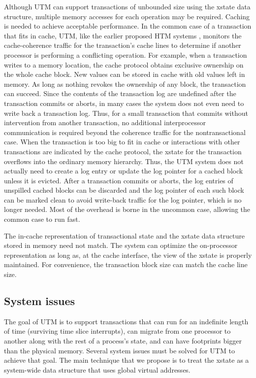 Although UTM can support transactions of unbounded size using the
xstate data structure, multiple memory accesses for each operation may
be required.  Caching is needed to achieve acceptable performance.  In
the common case of a transaction that fits in cache, UTM, like the
earlier proposed HTM systems \cite{Knight86,HerlihyMo93}, monitors the
cache-coherence traffic for the transaction's cache lines to determine
if another processor is performing a conflicting operation.  For
example, when a transaction writes to a memory location, the cache
protocol obtains exclusive ownership on the whole cache block.  New
values can be stored in cache with old values left in memory.  As long
as nothing revokes the ownership of any block, the transaction can
succeed.  Since the contents of the transaction log are undefined
after the transaction commits or aborts, in many cases the system does
not even need to write back a transaction log.  Thus, for a small
transaction that commits without intervention from another
transaction, no additional interprocessor communication is required
beyond the coherence traffic for the nontransactional case.  When the
transaction is too big to fit in cache or interactions with other
transactions are indicated by the cache protocol, the xstate for the
transaction overflows into the ordinary memory hierarchy.  Thus, the
UTM system does not actually need to create a log entry or update
the log pointer for a cached block unless it is evicted.  After a
transaction commits or aborts, the log entries of unspilled cached
blocks can be discarded and the log pointer of each such block can be
marked clean to avoid write-back traffic for the log pointer, which is
no longer needed.  Most of the overhead is borne in the uncommon case,
allowing the common case to run fast.

The in-cache representation of transactional state and the xstate data
structure stored in memory need not match.  The system can optimize
the on-processor representation as long as, at the cache interface, the
view of the xstate is properly maintained.  For convenience, the
transaction block size can match the cache line size.

\subsection{System issues}

The goal of UTM is to support transactions that can run for an
indefinite length of time (surviving time slice interrupts), can
migrate from one processor to another along with the rest of a
process's state, and can have footprints bigger than the physical
memory.  Several system issues must be solved for UTM to achieve that
goal.  The main technique that we propose is to treat the xstate as
a system-wide data structure that uses global virtual addresses.

